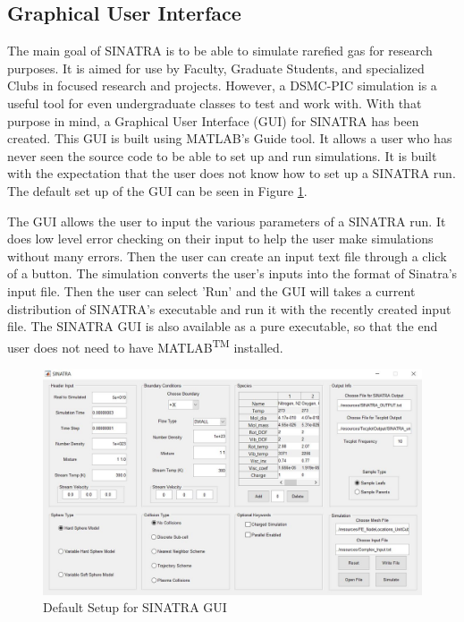 \subsection{Graphical User Interface}
The main goal of SINATRA is to be able to simulate rarefied gas for research purposes. It is aimed for use by Faculty, Graduate Students, and specialized Clubs in focused research and projects. However, a DSMC-PIC simulation is a useful tool for even undergraduate classes to test and work with. With that purpose in mind, a Graphical User Interface (GUI) for SINATRA has been created. This GUI is built using MATLAB's Guide tool. It allows a user who has never seen the source code to be able to set up and run simulations. It is built with the expectation that the user does not know how to set up a SINATRA run. The default set up of the GUI can be seen in Figure \ref{fig:SinatraGUI}. \par
The GUI allows the user to input the various parameters of a SINATRA run. It does low level error checking on their input to help the user make simulations without many errors. Then the user can create an input text file through a click of a button. The simulation converts the user's inputs into the format of Sinatra's input file. Then the user can select 'Run' and the GUI will takes a current distribution of SINATRA's executable and run it with the recently created input file. The SINATRA GUI is also available as a pure executable, so that the end user does not need to have MATLAB\textsuperscript{TM} installed. 

\begin{figure}
\includegraphics[width=.95\textwidth]{figures/SINATRA_GUI.JPG}
\centering
\caption{Default Setup for SINATRA GUI}
\label{fig:SinatraGUI}
\end{figure}